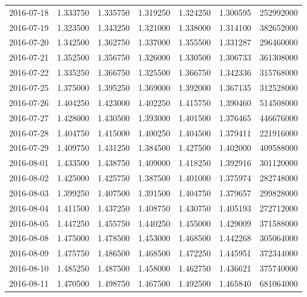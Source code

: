 \begin{tabular}{lrrrrrr}
2016-07-18 &    1.333750 &    1.335750 &    1.319250 &    1.324250 &    1.300595 &   252992000 \\
2016-07-19 &    1.323500 &    1.343250 &    1.321000 &    1.338000 &    1.314100 &   382652000 \\
2016-07-20 &    1.342500 &    1.362750 &    1.337000 &    1.355500 &    1.331287 &   296460000 \\
2016-07-21 &    1.352500 &    1.356750 &    1.326000 &    1.330500 &    1.306733 &   361308000 \\
2016-07-22 &    1.335250 &    1.366750 &    1.325500 &    1.366750 &    1.342336 &   315768000 \\
2016-07-25 &    1.375000 &    1.395250 &    1.369000 &    1.392000 &    1.367135 &   312528000 \\
2016-07-26 &    1.404250 &    1.423000 &    1.402250 &    1.415750 &    1.390460 &   514508000 \\
2016-07-27 &    1.428000 &    1.430500 &    1.393000 &    1.401500 &    1.376465 &   446676000 \\
2016-07-28 &    1.404750 &    1.415000 &    1.400250 &    1.404500 &    1.379411 &   221916000 \\
2016-07-29 &    1.409750 &    1.431250 &    1.384500 &    1.427500 &    1.402000 &   409588000 \\
2016-08-01 &    1.433500 &    1.438750 &    1.409000 &    1.418250 &    1.392916 &   301120000 \\
2016-08-02 &    1.425000 &    1.425750 &    1.387500 &    1.401000 &    1.375974 &   282748000 \\
2016-08-03 &    1.399250 &    1.407500 &    1.391500 &    1.404750 &    1.379657 &   299828000 \\
2016-08-04 &    1.411500 &    1.437250 &    1.408750 &    1.430750 &    1.405193 &   272712000 \\
2016-08-05 &    1.447250 &    1.455750 &    1.440250 &    1.455000 &    1.429009 &   371588000 \\
2016-08-08 &    1.475000 &    1.478500 &    1.453000 &    1.468500 &    1.442268 &   305064000 \\
2016-08-09 &    1.475750 &    1.486500 &    1.468500 &    1.472250 &    1.445951 &   372344000 \\
2016-08-10 &    1.485250 &    1.487500 &    1.458000 &    1.462750 &    1.436621 &   375740000 \\
2016-08-11 &    1.470500 &    1.498750 &    1.467500 &    1.492500 &    1.465840 &   681064000 \\

\end{tabular}
